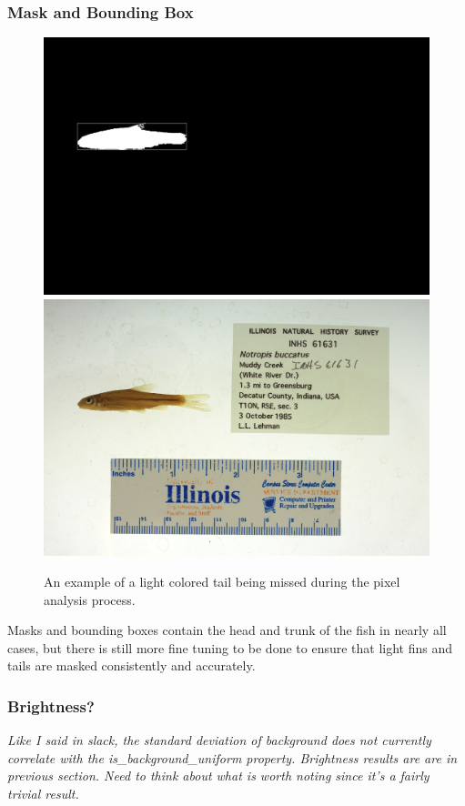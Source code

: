 \documentclass[conference]{IEEEtran}
\begin{document}
\subsubsection{Mask and Bounding Box}
\begin{figure}[H]
  \centering
  \includegraphics[width=0.49\linewidth]{images/61631}
  \includegraphics[width=0.49\linewidth]{images/61631_mask}
  \caption{An example of a light colored tail being missed during the pixel analysis process.}
\end{figure}
Masks and bounding boxes contain the head and trunk of the fish in nearly all cases, but there is still more fine tuning to be done to ensure that light fins and tails are masked consistently and accurately.

\subsubsection{Brightness?}
\textit{Like I said in slack, the standard deviation of background does not currently correlate with the is\_background\_uniform property. Brightness results are are in previous section. Need to think about what is worth noting since it's a fairly trivial result.}
\end{document}
